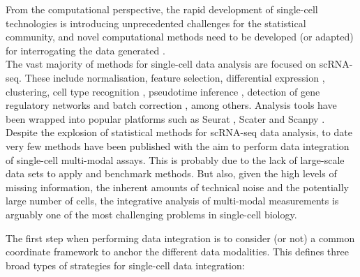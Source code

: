 From the computational perspective, the rapid development of single-cell technologies is introducing unprecedented challenges for the statistical community, and novel computational methods need to be developed (or adapted) for interrogating the data generated \cite{Stegle2015}.\\
The vast majority of methods for single-cell data analysis are focused on scRNA-seq. These include normalisation\cite{Lun2016a}, feature selection\cite{Townes2019}, differential expression \cite{Kharchenko2014}, clustering\cite{Kiselev2017}, cell type recognition \cite{Abdelaal2019}, pseudotime inference \cite{Haghverdi2016}, detection of gene regulatory networks and batch correction \cite{Haghverdi2018}, among others. Analysis tools have been wrapped into popular platforms such as Seurat \cite{Butler2018}, Scater \cite{McCarthy2017} and Scanpy \cite{Wolf2018}.\\
Despite the explosion of statistical methods for scRNA-seq data analysis, to date very few methods have been published  with the aim to perform data integration of single-cell multi-modal assays. This is probably due to the lack of large-scale data sets to apply and benchmark methods. But also, given the high levels of missing information, the inherent amounts of technical noise and the potentially large number of cells, the integrative analysis of multi-modal measurements is arguably one of the most challenging problems in single-cell biology.

The first step when performing data integration is to consider (or not) a common coordinate framework to anchor the different data modalities. This defines three broad types of strategies for single-cell data integration: 

